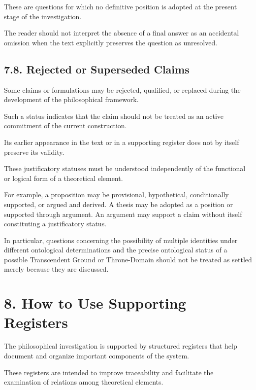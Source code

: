 These are questions for which no
definitive position is adopted at
the present stage of the investigation.

The reader should not interpret the
absence of a final answer as an
accidental omission when the text
explicitly preserves the question
as unresolved.

\subsection*{7.8. Rejected or Superseded Claims}

Some claims or formulations may be
rejected, qualified, or replaced during
the development of the philosophical
framework.

Such a status indicates that the claim
should not be treated as an active
commitment of the current construction.

Its earlier appearance in the text
or in a supporting register does not
by itself preserve its validity.

These justificatory statuses must be
understood independently of the functional
or logical form of a theoretical element.

For example, a proposition may be
provisional, hypothetical, conditionally
supported, or argued and derived.
A thesis may be adopted as a position
or supported through argument.
An argument may support a claim without
itself constituting a justificatory status.

In particular, questions concerning
the possibility of multiple identities
under different ontological determinations
and the precise ontological status of
a possible Transcendent Ground or
Throne-Domain should not be treated
as settled merely because they are
discussed.


\section*{8. How to Use Supporting Registers}

The philosophical investigation is supported
by structured registers that help document
and organize important components of
the system.

These registers are intended to improve
traceability and facilitate the examination
of relations among theoretical elements.

